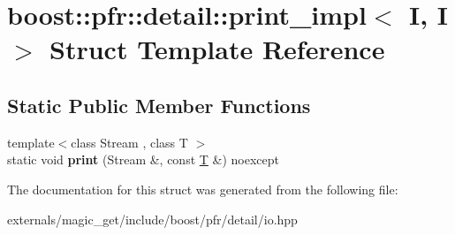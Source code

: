 \hypertarget{structboost_1_1pfr_1_1detail_1_1print__impl_3_01_i_00_01_i_01_4}{}\section{boost\+:\+:pfr\+:\+:detail\+:\+:print\+\_\+impl$<$ I, I $>$ Struct Template Reference}
\label{structboost_1_1pfr_1_1detail_1_1print__impl_3_01_i_00_01_i_01_4}
\subsection*{Static Public Member Functions}
\begin{DoxyCompactItemize}
\item 
\mbox{\label{structboost_1_1pfr_1_1detail_1_1print__impl_3_01_i_00_01_i_01_4_a7267e1e4280e12cc26992c774ee6ccc1}} 
{\footnotesize template$<$class Stream , class T $>$ }\\static void {\bfseries print} (Stream \&, const \mbox{\hyperlink{struct_t}{T}} \&) noexcept
\end{DoxyCompactItemize}


The documentation for this struct was generated from the following file\+:\begin{DoxyCompactItemize}
\item 
externals/magic\+\_\+get/include/boost/pfr/detail/io.\+hpp\end{DoxyCompactItemize}
